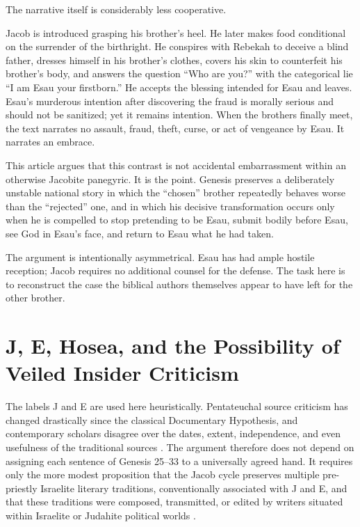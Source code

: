The narrative itself is considerably less cooperative.

Jacob is introduced grasping his brother's heel. He later makes food conditional on the surrender of the birthright. He conspires with Rebekah to deceive a blind father, dresses himself in his brother's clothes, covers his skin to counterfeit his brother's body, and answers the question ``Who are you?'' with the categorical lie ``I am Esau your firstborn.'' He accepts the blessing intended for Esau and leaves. Esau's murderous intention after discovering the fraud is morally serious and should not be sanitized; yet it remains intention. When the brothers finally meet, the text narrates no assault, fraud, theft, curse, or act of vengeance by Esau. It narrates an embrace.

This article argues that this contrast is not accidental embarrassment within an otherwise Jacobite panegyric. It is the point. Genesis preserves a deliberately unstable national story in which the ``chosen'' brother repeatedly behaves worse than the ``rejected'' one, and in which his decisive transformation occurs only when he is compelled to stop pretending to be Esau, submit bodily before Esau, see God in Esau's face, and return to Esau what he had taken.

The argument is intentionally asymmetrical. Esau has had ample hostile reception; Jacob requires no additional counsel for the defense. The task here is to reconstruct the case the biblical authors themselves appear to have left for the other brother.

\section{J, E, Hosea, and the Possibility of Veiled Insider Criticism}

The labels J and E are used here heuristically. Pentateuchal source criticism has changed drastically since the classical Documentary Hypothesis, and contemporary scholars disagree over the dates, extent, independence, and even usefulness of the traditional sources \parencite{Carr1996,Nicholson1998,Roemer2006}. The argument therefore does not depend on assigning each sentence of Genesis 25--33 to a universally agreed hand. It requires only the more modest proposition that the Jacob cycle preserves multiple pre-priestly Israelite literary traditions, conventionally associated with J and E, and that these traditions were composed, transmitted, or edited by writers situated within Israelite or Judahite political worlds \parencite{Friedman2003,Carr1996}.


